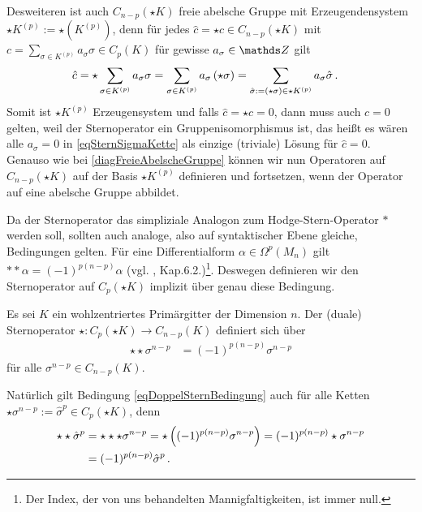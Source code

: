   Desweiteren ist auch \( C_{n-p}(\star K) \) freie abelsche Gruppe mit Erzeugendensystem \( \star K^{(p)} := \star\left( K^{(p)} \right) \), 
  denn für jedes \( \hat{c} = \star c \in C_{n-p}(\star K) \) mit \( c = \sum_{\sigma \in K^{(p)}} a_{\sigma}\sigma \in C_{p}(K) \) für gewisse \( a_{\sigma} \in \Z \) gilt
  \begin{align}
    \label{eqSternSigmaKette}
    \hat{c} &= \star \sum_{\sigma \in K^{(p)}} a_{\sigma}\sigma
             = \sum_{\sigma \in K^{(p)}} a_{\sigma} \left( \star\sigma\right)
             = \sum_{\hat{\sigma}:=\left( \star\sigma\right) \in \star K^{(p)} } a_{\sigma} \hat{\sigma} \,\text{.}
  \end{align}
  Somit ist \(\star K^{(p)}  \) Erzeugensystem und falls \( \hat{c} = \star c = 0 \), dann muss auch \( c = 0 \) gelten, weil der Sternoperator ein Gruppenisomorphismus ist,
  das heißt es wären alle \( a_{\sigma} = 0 \) in \eqref{eqSternSigmaKette} als einzige (triviale) Lösung für \( \hat{c} = 0 \).
  Genauso wie bei \eqref{diagFreieAbelscheGruppe} können wir nun Operatoren auf \( C_{n-p}(\star K) \) auf der Basis \( \star K^{(p)} \) definieren und fortsetzen, 
  wenn der Operator auf eine abelsche Gruppe abbildet.

  Da der Sternoperator das simpliziale Analogon zum Hodge-Stern-Operator \( * \) werden soll, sollten auch analoge, also auf syntaktischer Ebene gleiche, Bedingungen gelten.
  Für eine Differentialform \( \alpha\in\Omega^{p}(M_{n}) \) gilt 
  \( **\alpha = (-1)^{p(n-p)}\alpha \) (vgl. \cite{Marsden}, Kap.6.2.)\footnote{Der Index, der von uns behandelten Mannigfaltigkeiten, ist immer null.}.
  Deswegen definieren wir den Sternoperator auf \( C_{p}(\star K) \) implizit über genau diese Bedingung.

  \begin{definition}
    Es sei \( K \) ein wohlzentriertes Primärgitter der Dimension \( n \).
    Der (duale) Sternoperator \( \star: C_{p}(\star K) \rightarrow   C_{n-p}(K) \) definiert sich über
    \begin{align}
      \label{eqDoppelSternBedingung}
      \star\star \sigma^{n-p} &= (-1)^{p(n-p)}\sigma^{n-p}
    \end{align}
    für alle \( \sigma^{n-p} \in C_{n-p}(K) \).
  \end{definition}
  Natürlich gilt Bedingung \eqref{eqDoppelSternBedingung} auch für alle Ketten \( \star\sigma^{n-p} := \hat{\sigma}^{p} \in C_{p}(\star K)\), denn
  \begin{align}
    \begin{aligned}
    \star\star\hat{\sigma}^{p} &= \star\star\star\sigma^{n-p} = \star\left((-1)^{p(n-p)}\sigma^{n-p}\right)
                                = (-1)^{p(n-p)}\star\sigma^{n-p} \\
                                &=  (-1)^{p(n-p)}\hat{\sigma}^{p} \,\text{.}
    \end{aligned}
  \end{align}

